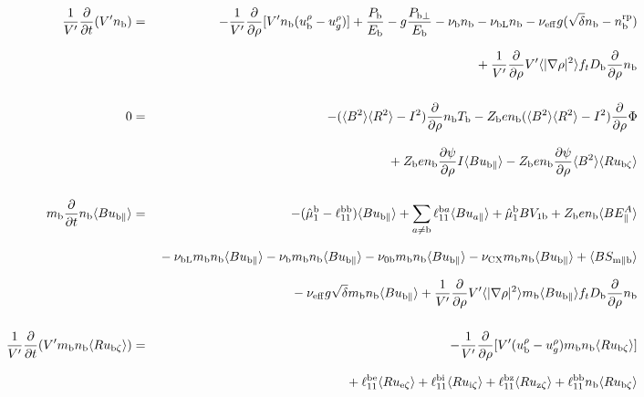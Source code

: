 \documentclass[11pt]{article}
\def\r#1{{\rm#1}}
\def\aves#1{\langle#1\rangle}
\def\dd#1#2{\frac{\partial #1}{\partial #2}}
\def\para{\parallel}
\def\ddrho{\frac{\partial}{\partial\rho}}
\def\ddV{\frac{\partial}{\partial V}}
\def\ddt{\frac{\partial}{\partial t}}
\def\mb{m_\r{b}}
\def\ni{n_\r{i}}
\def\nb{n_\r{b}}
\def\Tb{T_\r{b}}
\def\Zb{Z_\r{b}}
\def\uzt#1{u_{\r{#1}\zeta}}
\def\upara#1{u_{\r{#1}\para}}
\def\qhatpara#1{\hat{q}_{\r{#1}\para}}
\def\urho#1{u_\r{#1}^\rho}
\def\ugrho{u_{g}^\rho}
\def\chis#1{\chi_\r{#1}}
\def\nun#1{\nu_\r{0#1}}
\def\nbrp{n_\r{b}^\r{rp}}
\def\Db{D_\r{b}}
\def\bri{\aves{B^2}\aves{R^2} - I^2}
\def\Pbpara{P_{\r{b}\parallel}}
\def\Pbperp{P_{\r{b}\perp}}
\def\Pb{P_\r{b}}
\def\Eb{E_\r{b}}
\def\nueff{\nu_\r{eff}}
\def\nuCX{\nu_\r{CX}}
\def\nub{\nu_\r{b}}
\def\nubL{\nu_\r{bL}}
\def\red#1{\textcolor{red}{#1}}
\begin{document}
%
\begin{eqnarray}
  \frac{1}{V'} \ddt (V' \nb) &=&
%
  - \frac{1}{V'} \ddrho [ V' \nb (\urho{b} - \ugrho) ]
%
  + \frac{\Pb}{\Eb}
%
  - g \frac{\Pbperp}{\Eb}
%
  - \nub \nb
%
  - \nubL \nb
%
  - \nueff g (\sqrt{\delta} \nb - \nbrp)
%
\nonumber\\[2.5mm]&&{}
  + \frac{1}{V'} \ddrho V'\aves{|\nabla\rho|^2} f_t \Db \ddrho \nb
%
\\[5mm]
  0 &=&
%
  -           ( \bri ) \ddrho \nb \Tb
%
  - \Zb e \nb ( \bri ) \ddrho \Phi
\nonumber\\[3mm]&&{}
%
  + \Zb e \nb \dd{\psi}{\rho} I          \aves{B\upara{b}}
%
  - \Zb e \nb \dd{\psi}{\rho} \aves{B^2} \aves{R\uzt{b}}
\\[5mm]
  \mb \ddt \nb \aves{B \upara{b}} &=&
%
  - (\hat{\mu}_1^\r{b} - \ell_{11}^\r{bb}) \aves{B \upara{b}}
%
  + \sum_{a\neq\r{b}} \ell_{11}^{\r{b}a} \aves{B u_{a\para}}
%
  + \hat{\mu}_1^\r{b} {B V_{1\r{b}}}
%
  + \Zb e \nb \aves{B E_\para^A}
\nonumber\\[2.5mm]&&{}
%
  - \nubL \mb \nb \aves{B\upara{b}}
%
  - \nub  \mb \nb \aves{B\upara{b}}
%
  - \nun{b} \mb \nb \aves{B\upara{b}}
%
  - \nuCX \mb \nb \aves{B\upara{b}}
%
  + \aves{B S_{\r{m}\para\r{b}}}
%
%
\nonumber\\[2.5mm]&&{}
  - \nueff g \sqrt{\delta} \mb \nb \aves{B\upara{b}}
%
  + \frac{1}{V'} \ddrho V' \aves{|\nabla\rho|^2} \mb \aves{B\upara{b}} f_t \Db \ddrho \nb
\\[5mm]
  \frac{1}{V'} \ddt (V' \mb \nb \aves{R \uzt{b}}) &=&
%
  - \frac{1}{V'} \dd{}{\rho}[ V' (\urho{b} - \ugrho) \mb \nb \aves{R \uzt{b}} ]
%
\nonumber\\[2.5mm]&&{}
%
  + \ell_{11}^\r{be} \aves{R \uzt{e}}
  + \ell_{11}^\r{bi} \aves{R \uzt{i}}
  + \ell_{11}^\r{bz} \aves{R \uzt{z}}
  + \ell_{11}^\r{bb} \nb \aves{R \uzt{b}}
\nonumber\\[2.5mm]&&{}
%

\end{eqnarray}
\end{document}
